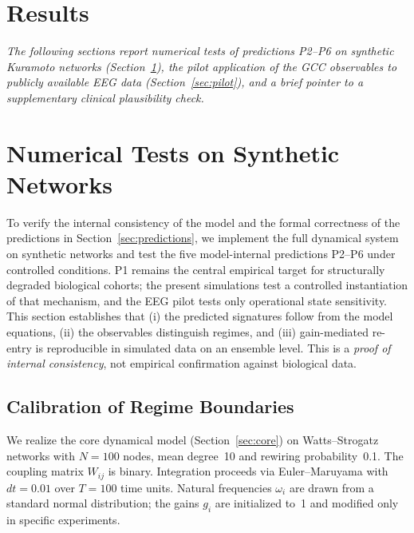 ﻿\documentclass[11pt,a4paper]{article}
\theoremstyle{plain}
\theoremstyle{definition}
\theoremstyle{remark}
\begin{document}
\section*{Results}

\noindent\textit{The following sections report numerical tests of predictions P2--P6 on synthetic Kuramoto networks (Section~\ref{sec:numerics}), the pilot application of the GCC observables to publicly available EEG data (Section~\ref{sec:pilot}), and a brief pointer to a supplementary clinical plausibility check.}

\section{Numerical Tests on Synthetic Networks}
\label{sec:numerics}

To verify the internal consistency of the model and the formal correctness of the predictions in Section~\ref{sec:predictions}, we implement the full dynamical system on synthetic networks and test the five model-internal predictions P2--P6 under controlled conditions. P1 remains the central empirical target for structurally degraded biological cohorts; the present simulations test a controlled instantiation of that mechanism, and the EEG pilot tests only operational state sensitivity. This section establishes that (i) the predicted signatures follow from the model equations, (ii) the observables distinguish regimes, and (iii) gain-mediated re-entry is reproducible in simulated data on an ensemble level. This is a \emph{proof of internal consistency}, not empirical confirmation against biological data.

\subsection{Calibration of Regime Boundaries}

We realize the core dynamical model (Section~\ref{sec:core}) on Watts--Strogatz networks with $N = 100$ nodes, mean degree~10 and rewiring probability~0.1. The coupling matrix $W_{ij}$ is binary. Integration proceeds via Euler--Maruyama with $dt = 0.01$ over $T = 100$ time units. Natural frequencies $\omega_i$ are drawn from a standard normal distribution; the gains $g_i$ are initialized to~1 and modified only in specific experiments.
\end{document}
